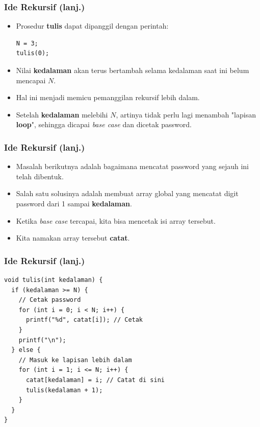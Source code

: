 \begin{frame}[fragile]
\frametitle{Ide Rekursif (lanj.)}
\begin{itemize}
  \item Prosedur \textbf{tulis} dapat dipanggil dengan perintah:
\begin{lstlisting}
N = 3;
tulis(0);
\end{lstlisting}
  
  \item Nilai \textbf{kedalaman} akan terus bertambah selama kedalaman saat ini belum mencapai $N$. 
  \item Hal ini menjadi memicu pemanggilan rekursif lebih dalam.
  \item Setelah \textbf{kedalaman} melebihi $N$, artinya tidak perlu lagi menambah "lapisan \textbf{loop}", sehingga dicapai \textit{base case} dan dicetak password. 
\end{itemize}
\end{frame}

\begin{frame}[fragile]
\frametitle{Ide Rekursif (lanj.)}
\begin{itemize}
  \item Masalah berikutnya adalah bagaimana mencatat password yang sejauh ini telah dibentuk.
  \item Salah satu solusinya adalah membuat array global yang mencatat digit password dari 1 sampai \textbf{kedalaman}.
  \item Ketika \textit{base case} tercapai, kita bisa mencetak isi array tersebut.
  \item Kita namakan array tersebut \textbf{catat}.
\end{itemize}
\end{frame}

\begin{frame}[fragile]
\frametitle{Ide Rekursif (lanj.)}
\begin{lstlisting}
void tulis(int kedalaman) {
  if (kedalaman >= N) {
    // Cetak password
    for (int i = 0; i < N; i++) {
      printf("%d", catat[i]); // Cetak
    }
    printf("\n");
  } else {
    // Masuk ke lapisan lebih dalam
    for (int i = 1; i <= N; i++) {
      catat[kedalaman] = i; // Catat di sini
      tulis(kedalaman + 1);
    }
  }
}
\end{lstlisting}
\end{frame}

